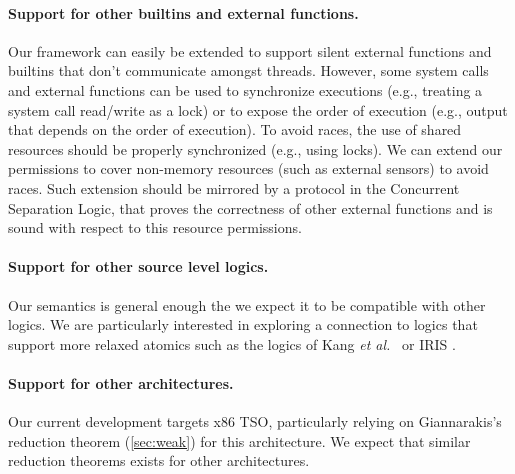 \paragraph{Support for other builtins and external functions.}   
Our framework can easily be extended to support silent external functions and builtins that don't communicate amongst threads. However, some system calls and external functions can be used to synchronize executions (e.g., treating a system call read/write as a lock) or to expose the order of execution (e.g., output that depends on the order of execution). To avoid races, the use of shared resources should be properly synchronized (e.g., using locks). We can extend our permissions to cover non-memory resources (such as external sensors) to avoid races. Such extension should be mirrored by a protocol in the Concurrent Separation Logic, that proves the correctness of other external functions and is sound with respect to this resource permissions. 

\paragraph{Support for other source level logics.} Our semantics is general enough the we expect it to be compatible with other logics. We are particularly interested in exploring a connection to logics that support more relaxed atomics such as the logics of Kang \emph{et al.}~\cite{Kang2017promising} or IRIS \cite{jung2015iris}.

\paragraph{Support for other architectures.} Our current development targets x86 TSO, particularly relying on Giannarakis's reduction theorem (\autoref{sec:weak}) for this architecture. We expect that similar reduction theorems exists for other architectures. 
